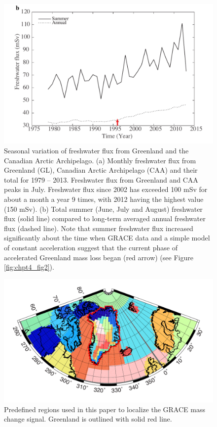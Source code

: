 \begin{figure}
	\centering
	\includegraphics{figs_app/FigS9b.pdf}
	\caption[Seasonal variation of freshwater flux from Greenland and the Canadian Arctic Archipelago.]{Seasonal variation of freshwater flux from Greenland and the Canadian Arctic Archipelago. (a) Monthly freshwater flux from Greenland (GL), Canadian Arctic Archipelago (CAA) and their total for 1979 – 2013.   Freshwater flux from Greenland and CAA peaks in July.  Freshwater flux since 2002 has exceeded 100 mSv for about a month a year 9 times, with 2012 having the highest value (150 mSv).  (b) Total summer (June, July and August) freshwater flux (solid line) compared to long-term averaged annual freshwater flux (dashed line).  Note that summer freshwater flux increased significantly about the time when GRACE data and a simple model of constant acceleration suggest that the current phase of accelerated Greenland mass loss began (red arrow) (see Figure \ref{fig:chpt4_fig2}).}
	\label{fig:SI4_fig9}
\end{figure}

\begin{figure}
	\centering
	\includegraphics{figs_app/FigS10.pdf}
	\caption[Predefined regions used in this paper to localize the GRACE mass change signal.]{Predefined regions used in this paper to localize the GRACE mass change signal.  Greenland is outlined with solid red line.}
	\label{fig:SI4_fig10}
\end{figure}


